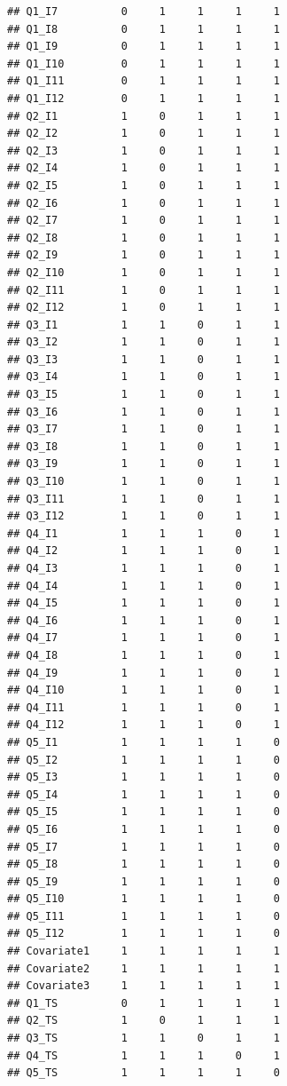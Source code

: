 \documentclass[
]{book}
\begin{document}
\begin{verbatim}
## Q1_I7          0     1     1     1     1
## Q1_I8          0     1     1     1     1
## Q1_I9          0     1     1     1     1
## Q1_I10         0     1     1     1     1
## Q1_I11         0     1     1     1     1
## Q1_I12         0     1     1     1     1
## Q2_I1          1     0     1     1     1
## Q2_I2          1     0     1     1     1
## Q2_I3          1     0     1     1     1
## Q2_I4          1     0     1     1     1
## Q2_I5          1     0     1     1     1
## Q2_I6          1     0     1     1     1
## Q2_I7          1     0     1     1     1
## Q2_I8          1     0     1     1     1
## Q2_I9          1     0     1     1     1
## Q2_I10         1     0     1     1     1
## Q2_I11         1     0     1     1     1
## Q2_I12         1     0     1     1     1
## Q3_I1          1     1     0     1     1
## Q3_I2          1     1     0     1     1
## Q3_I3          1     1     0     1     1
## Q3_I4          1     1     0     1     1
## Q3_I5          1     1     0     1     1
## Q3_I6          1     1     0     1     1
## Q3_I7          1     1     0     1     1
## Q3_I8          1     1     0     1     1
## Q3_I9          1     1     0     1     1
## Q3_I10         1     1     0     1     1
## Q3_I11         1     1     0     1     1
## Q3_I12         1     1     0     1     1
## Q4_I1          1     1     1     0     1
## Q4_I2          1     1     1     0     1
## Q4_I3          1     1     1     0     1
## Q4_I4          1     1     1     0     1
## Q4_I5          1     1     1     0     1
## Q4_I6          1     1     1     0     1
## Q4_I7          1     1     1     0     1
## Q4_I8          1     1     1     0     1
## Q4_I9          1     1     1     0     1
## Q4_I10         1     1     1     0     1
## Q4_I11         1     1     1     0     1
## Q4_I12         1     1     1     0     1
## Q5_I1          1     1     1     1     0
## Q5_I2          1     1     1     1     0
## Q5_I3          1     1     1     1     0
## Q5_I4          1     1     1     1     0
## Q5_I5          1     1     1     1     0
## Q5_I6          1     1     1     1     0
## Q5_I7          1     1     1     1     0
## Q5_I8          1     1     1     1     0
## Q5_I9          1     1     1     1     0
## Q5_I10         1     1     1     1     0
## Q5_I11         1     1     1     1     0
## Q5_I12         1     1     1     1     0
## Covariate1     1     1     1     1     1
## Covariate2     1     1     1     1     1
## Covariate3     1     1     1     1     1
## Q1_TS          0     1     1     1     1
## Q2_TS          1     0     1     1     1
## Q3_TS          1     1     0     1     1
## Q4_TS          1     1     1     0     1
## Q5_TS          1     1     1     1     0
\end{verbatim}
\end{document}
